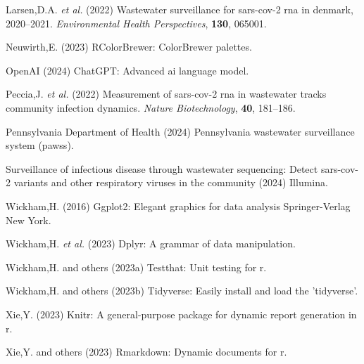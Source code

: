 \documentclass[
]{article}
\begin{document}
\leavevmode\hypertarget{ref-PMC9023356}{}%
Larsen,D.A. \emph{et al.} (2022) Wastewater surveillance for sars-cov-2
rna in denmark, 2020--2021. \emph{Environmental Health Perspectives},
\textbf{130}, 065001.

\leavevmode\hypertarget{ref-RColorBrewer}{}%
Neuwirth,E. (2023) RColorBrewer: ColorBrewer palettes.

\leavevmode\hypertarget{ref-OpenAI2024ChatGPT}{}%
OpenAI (2024) ChatGPT: Advanced ai language model.

\leavevmode\hypertarget{ref-2022Peccia}{}%
Peccia,J. \emph{et al.} (2022) Measurement of sars-cov-2 rna in
wastewater tracks community infection dynamics. \emph{Nature
Biotechnology}, \textbf{40}, 181--186.

\leavevmode\hypertarget{ref-2024PAWSS}{}%
Pennsylvania Department of Health (2024) Pennsylvania wastewater
surveillance system (pawss).

\leavevmode\hypertarget{ref-2024illumina}{}%
Surveillance of infectious disease through wastewater sequencing: Detect
sars-cov-2 variants and other respiratory viruses in the community
(2024) Illumina.

\leavevmode\hypertarget{ref-2016ggplot2}{}%
Wickham,H. (2016) Ggplot2: Elegant graphics for data analysis
Springer-Verlag New York.

\leavevmode\hypertarget{ref-2023dplyr}{}%
Wickham,H. \emph{et al.} (2023) Dplyr: A grammar of data manipulation.

\leavevmode\hypertarget{ref-testthat}{}%
Wickham,H. and others (2023a) Testthat: Unit testing for r.

\leavevmode\hypertarget{ref-Rtidyverse}{}%
Wickham,H. and others (2023b) Tidyverse: Easily install and load the
'tidyverse'.

\leavevmode\hypertarget{ref-knitr}{}%
Xie,Y. (2023) Knitr: A general-purpose package for dynamic report
generation in r.

\leavevmode\hypertarget{ref-Rrmarkdown}{}%
Xie,Y. and others (2023) Rmarkdown: Dynamic documents for r.
\end{document}
